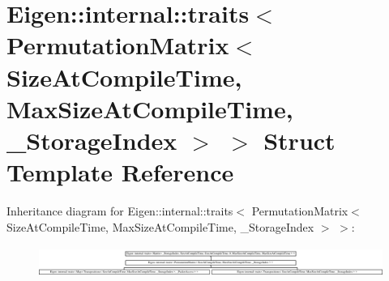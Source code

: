 \hypertarget{struct_eigen_1_1internal_1_1traits_3_01_permutation_matrix_3_01_size_at_compile_time_00_01_max_sd0808d93099012556270f7c7cd36fcc5}{}\section{Eigen\+::internal\+::traits$<$ Permutation\+Matrix$<$ Size\+At\+Compile\+Time, Max\+Size\+At\+Compile\+Time, \+\_\+\+Storage\+Index $>$ $>$ Struct Template Reference}
\label{struct_eigen_1_1internal_1_1traits_3_01_permutation_matrix_3_01_size_at_compile_time_00_01_max_sd0808d93099012556270f7c7cd36fcc5}
Inheritance diagram for Eigen\+::internal\+::traits$<$ Permutation\+Matrix$<$ Size\+At\+Compile\+Time, Max\+Size\+At\+Compile\+Time, \+\_\+\+Storage\+Index $>$ $>$\+:\begin{figure}[H]
\begin{center}
\leavevmode
\includegraphics[height=1.018182cm]{struct_eigen_1_1internal_1_1traits_3_01_permutation_matrix_3_01_size_at_compile_time_00_01_max_sd0808d93099012556270f7c7cd36fcc5}
\end{center}
\end{figure}
